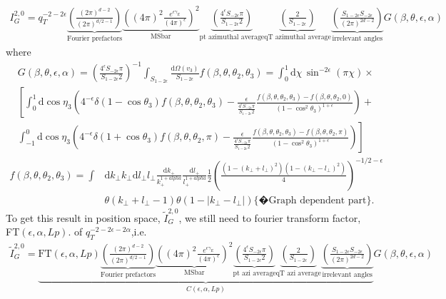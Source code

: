 \documentclass[a4paper,11pt]{article}
\numberwithin{equation}{section}
\newcommand{\dd}{\text{d}}
\newcommand{\eps}{\epsilon}
\begin{document}
\begin{align}
I_G^{2,0}= q_T^{-2-2\eps}
\underbrace{\left( 
\frac{(2\pi)^{d-2}}{(2\pi)^{d/2-1}}\right)}_{\text{Fourier prefactors}}
\underbrace{\left( (4\pi)^2
\frac{e^{\eps \gamma_E}}{(4\pi)^\eps} \right)^2}_{\text{MSbar}}
\underbrace{\left(\frac{4^\eps S_{-2\eps}\pi}{S_{1-2\eps}2}\right)}_{\text{pt azimuthal average}}  
\underbrace{ \left( \frac{2}{S_{1-2\eps}} \right)}_{\text{qT azimuthal average}}
\underbrace{\left( \frac{ S_{1-2\eps}   S_{-2\eps}}{(2\pi)^{2d-2}}  \right)}_{\text{irrelevant angles}}  
G(\beta,\theta,\eps,\alpha)
\end{align}
where 
\begin{align}
&G(\beta,\theta,\eps,\alpha)=\left(\frac{4^\eps S_{-2\eps}\pi}{S_{1-2\eps}2}\right)^{-1}  \int_{S_{1-2\eps}}\frac{\dd \Omega(v_3)}{S_{1-2\eps}}
f(\beta,\theta,\theta_2,\theta_3)=
\int_{0}^{1}  \dd \chi \, \sin^{-2\epsilon}(\pi \chi) \times
 \nonumber\\
&\left[ 
\int_{0}^{1}\dd\!\cos{\eta_3} 
\left( 4^{-\eps}
\delta(1-\cos{\theta_3}) f(\beta,\theta,\theta_2,\theta_3)
-\frac{\eps}{\frac{4^\eps S_{-2\eps}\pi}{S_{1-2\eps}2}} 
\frac{f(\beta,\theta,\theta_2,\theta_3)-f(\beta,\theta,
\theta_2,0)}{\left( 1-\cos^2\theta_3\right)^{1+\epsilon}}  \right)
\right.+\nonumber \\
&\left.
\int^{0}_{-1}\dd\!\cos{\eta_3} \left( 
4^{-\eps} \delta(1+\cos{\theta_3}) f(\beta,\theta,
\theta_2,\pi)
-\frac{\eps}{\frac{4^\eps S_{-2\eps}\pi}{S_{1-2\eps}2}} 
\frac{f(\beta,\theta,\theta_2,\theta_3)-f(\beta,\theta,
\theta_2,\pi)}{\left( 1-\cos^2\theta_3\right)^{1+\epsilon}}  \right) 
\right]\,
\end{align}
\begin{align}
f(\beta,\theta,\theta_2,\theta_3)= 
\int 
& \dd k_\perp k_\perp \dd l_\perp l_\perp  \frac{\dd k_+} {k_+^{1+alpha}}\frac{\dd l_+}{l_+^{1+alpha}}   
  \frac{1}{2}\left( \frac{(1-(k_\perp+l_\perp)^2)
  (1-(k_\perp-l_\perp)^2)}{4}\right)^{-1/2-\epsilon} \nonumber\\
  &\theta(k_\perp+l_\perp-1) \theta(1-|k_\perp-l_\perp|)  \{�\text{Graph dependent part} \} . 
\end{align}
To get this result in position space,
$\widetilde{I}_G^{2,0}$, we still need to 
fourier transform factor, FT$(\eps,\alpha,Lp)$. of $q_T^{-2-2\eps-2\alpha}$,i.e.
\begin{align}
\widetilde{I}_G^{2,0}=
\underbrace{ 
\text{FT}(\eps,\alpha,Lp)
\underbrace{\left( 
\frac{(2\pi)^{d-2}}{(2\pi)^{d/2-1}}\right)}_{\text{Fourier prefactors}}
\underbrace{\left( (4\pi)^2
\frac{e^{\eps \gamma_E}}{(4\pi)^\eps} \right)^2}_{\text{MSbar}}
\underbrace{\left(\frac{4^\eps S_{-2\eps}\pi}{S_{1-2\eps}2}\right)}_{\text{pt azi average}}  
\underbrace{ \left( \frac{2}{S_{1-2\eps}} \right)}_{\text{qT azi average}}
\underbrace{\left( \frac{ S_{1-2\eps}   S_{-2\eps}}{(2\pi)^{2d-2}}  \right)}_{\text{irrelevant angles}}  
}_{C(\eps,\alpha,Lp)}
G (\beta,\theta,\eps,\alpha)
\end{align}
\end{document}
